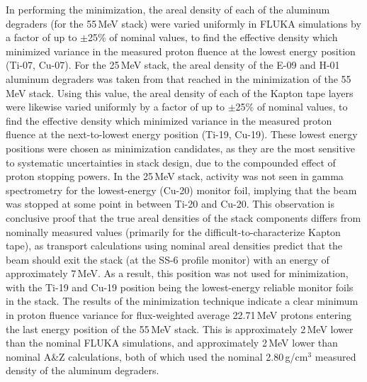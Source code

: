 In performing the  minimization, the areal density of each of the  aluminum degraders (for the 55\,MeV stack)  were varied uniformly in FLUKA simulations  by a factor of up to $\pm$25\% of nominal values, to find the effective density which minimized variance in the measured proton fluence at the lowest energy position (Ti-07, Cu-07).
For the 25\,MeV stack, the areal density of the E-09 and H-01 aluminum degraders was taken from that reached in the minimization of the 55\,MeV stack.
Using this value, the areal density of each of the  Kapton tape  layers  were likewise varied uniformly   by a factor of up to $\pm$25\% of nominal values, to find the effective density which minimized variance in the measured proton fluence at the next-to-lowest energy position (Ti-19, Cu-19).
These lowest energy positions were chosen as  minimization candidates, as they are the most sensitive to systematic uncertainties in stack design, due to the compounded effect of proton stopping powers.
In the 25\,MeV stack, activity was not seen in gamma spectrometry for the lowest-energy (Cu-20) monitor foil, implying that the beam was stopped at some point in between Ti-20 and Cu-20.
This observation is conclusive proof that  the true areal densities of the stack components differs from nominally measured values (primarily for the difficult-to-characterize Kapton tape), as transport calculations using nominal areal densities predict that the beam should exit the stack (at the SS-6 profile monitor) with an energy of approximately 7\,MeV.
As a result, this position was not used for minimization, with the Ti-19 and Cu-19 position being the lowest-energy reliable monitor foils in the stack.
% 
% 
% 
The results of the minimization technique indicate a clear minimum in proton fluence variance for flux-weighted average 22.71\,MeV protons entering the last energy position of the 55\,MeV stack.
This is approximately 2\,MeV lower than the nominal FLUKA simulations, and approximately 2\,MeV lower than nominal A\&Z calculations, both of which used the nominal 2.80\,g/cm$^3$ measured density of the  aluminum degraders.
